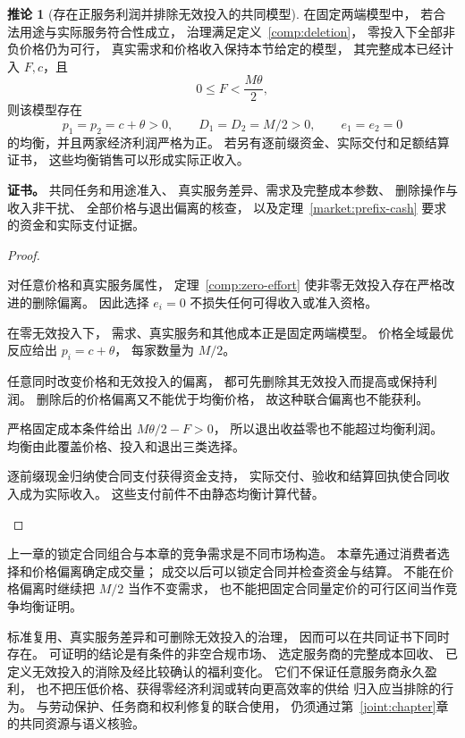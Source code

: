 \documentclass[UTF8,12pt,a4paper,openany,fontset=none,zihao=false]{ctexrep}
\theoremstyle{definition}
\newtheorem{corollary}{推论}[chapter]
\newenvironment{certificate}{\par\noindent\textbf{证书。}\ignorespaces}{\par}
\newcommand{\1}{\mathbf 1}
\begin{document}
\begin{corollary}[存在正服务利润并排除无效投入的共同模型]
\label{comp:joint-market}
在固定两端模型中，
若合法用途与实际服务符合性成立，
治理满足定义~\ref{comp:deletion}，
零投入下全部非负价格仍为可行，
真实需求和价格收入保持本节给定的模型，
其完整成本已经计入 \(F,c\)，且
\[
 0\le F<\frac{M\theta}{2},
\]
则该模型存在
\[
 p_1=p_2=c+\theta>0,\qquad
 D_1=D_2=M/2>0,\qquad e_1=e_2=0
\]
的均衡，并且两家经济利润严格为正。
若另有逐前缀资金、实际交付和足额结算证书，
这些均衡销售可以形成实际正收入。
\end{corollary}
\begin{certificate}
共同任务和用途准入、
真实服务差异、需求及完整成本参数、
删除操作与收入非干扰、
全部价格与退出偏离的核查，
以及定理~\ref{market:prefix-cash}
要求的资金和实际支付证据。
\end{certificate}
\begin{proof}
\begin{semanticsteps}
\item 对任意价格和真实服务属性，
定理~\ref{comp:zero-effort}
使非零无效投入存在严格改进的删除偏离。
因此选择 \(e_i=0\) 不损失任何可得收入或准入资格。
\item 在零无效投入下，
需求、真实服务和其他成本正是固定两端模型。
价格全域最优反应给出
\(p_i=c+\theta\)，
每家数量为 \(M/2\)。
\item 任意同时改变价格和无效投入的偏离，
都可先删除其无效投入而提高或保持利润。
删除后的价格偏离又不能优于均衡价格，
故这种联合偏离也不能获利。
\item 严格固定成本条件给出
\(M\theta/2-F>0\)，
所以退出收益零也不能超过均衡利润。
均衡由此覆盖价格、投入和退出三类选择。
\item 逐前缀现金归纳使合同支付获得资金支持，
实际交付、验收和结算回执使合同收入成为实际收入。
这些支付前件不由静态均衡计算代替。
\end{semanticsteps}
\end{proof}

上一章的锁定合同组合与本章的竞争需求是不同市场构造。
本章先通过消费者选择和价格偏离确定成交量；
成交以后可以锁定合同并检查资金与结算。
不能在价格偏离时继续把 \(M/2\) 当作不变需求，
也不能把固定合同量定价的可行区间当作竞争均衡证明。

标准复用、真实服务差异和可删除无效投入的治理，
因而可以在共同证书下同时存在。
可证明的结论是有条件的非空合规市场、
选定服务商的完整成本回收、
已定义无效投入的消除及经比较确认的福利变化。
它们不保证任意服务商永久盈利，
也不把压低价格、获得零经济利润或转向更高效率的供给
归入应当排除的行为。
与劳动保护、任务商和权利修复的联合使用，
仍须通过第~\ref{joint:chapter}章的共同资源与语义核验。
\end{document}
